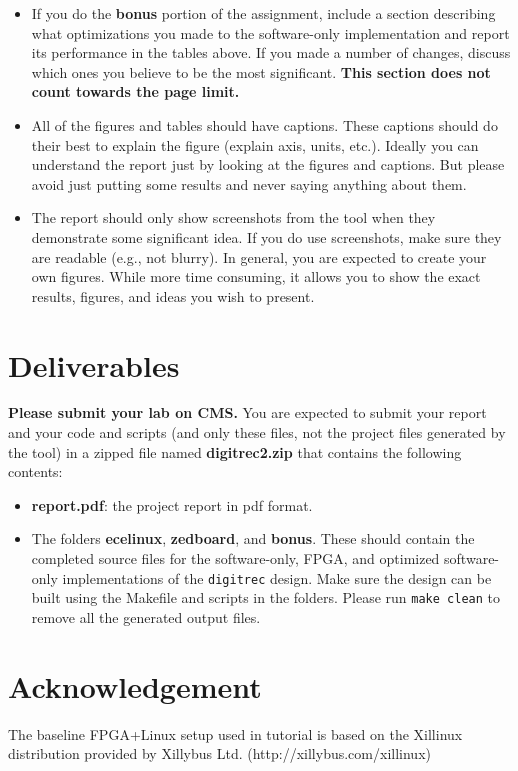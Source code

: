 \documentclass[paper=letter, fontsize=11.6pt]{scrartcl} %
\numberwithin{equation}{section} %
\numberwithin{figure}{section} %
\numberwithin{table}{section} %
\begin{document}
\begin{itemize}
\item If you do the \textbf{bonus} portion of the assignment, include a section describing what optimizations you made to the software-only implementation and report its performance in the tables above. If you made a number of changes, discuss which ones you believe to be the most significant. \textbf{This section does not count towards the page limit.}
  
\item All of the figures and tables should have captions. These captions should do their best to  explain the figure (explain axis, units, etc.). Ideally you can understand the report just by looking at the figures and captions. But please avoid just putting some results and never saying anything about them.

\item The report should only show screenshots from the tool when they demonstrate some significant idea. If you do use screenshots, make sure they are readable (e.g., not blurry). In general, you are expected to create your own figures. While more time consuming, it allows you to show the exact results, figures, and ideas you wish to present.
\end{itemize}

\section{Deliverables}
\label{deliverables}
\textbf{Please submit your lab on CMS.} You are expected to submit your report and your code and scripts (and only these files, not the project files generated by the tool) in a zipped file named \textbf{digitrec2.zip} that contains the following contents:
\begin{itemize}
    \item \textbf{report.pdf}: the project report in pdf format.
    \item The folders \textbf{ecelinux}, \textbf{zedboard}, and \textbf{bonus}. 
      These should contain the completed source files
      for the software-only, FPGA, and optimized software-only implementations of the \texttt{digitrec} design.
      Make sure the design can be built using the Makefile and scripts in the folders.
      Please run \texttt{make clean} to remove all the generated output files.
\end{itemize}

\section{Acknowledgement}
The baseline FPGA+Linux setup used in tutorial is based on the Xillinux distribution provided by Xillybus Ltd. (http://xillybus.com/xillinux)
\end{document}
